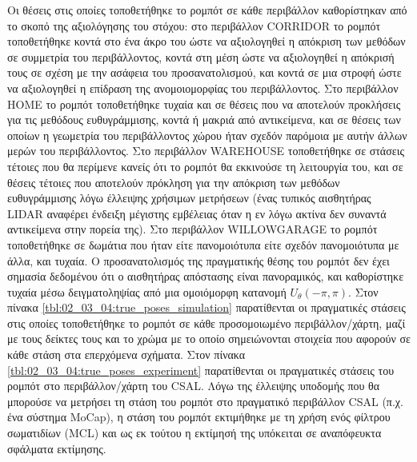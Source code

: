 Οι θέσεις στις οποίες τοποθετήθηκε το ρομπότ σε κάθε περιβάλλον καθορίστηκαν
από το σκοπό της αξιολόγησης του στόχου: στο περιβάλλον CORRIDOR το ρομπότ
τοποθετήθηκε κοντά στο ένα άκρο του ώστε να αξιολογηθεί η απόκριση των μεθόδων
σε συμμετρία του περιβάλλοντος, κοντά στη μέση ώστε να αξιολογηθεί η απόκρισή
τους σε σχέση με την ασάφεια του προσανατολισμού, και κοντά σε μια στροφή ώστε
να αξιολογηθεί η επίδραση της ανομοιομορφίας του περιβάλλοντος. Στο περιβάλλον
HOME το ρομπότ τοποθετήθηκε τυχαία και σε θέσεις που να αποτελούν προκλήσεις
για τις μεθόδους ευθυγράμμισης, κοντά ή μακριά από αντικείμενα, και σε θέσεις
των οποίων η γεωμετρία του περιβάλλοντος χώρου ήταν σχεδόν παρόμοια με αυτήν
άλλων μερών του περιβάλλοντος. Στο περιβάλλον WAREHOUSE τοποθετήθηκε σε
στάσεις τέτοιες που θα περίμενε κανείς ότι το ρομπότ θα εκκινούσε τη λειτουργία
του, και σε θέσεις τέτοιες που αποτελούν πρόκληση για την απόκριση των μεθόδων
ευθυγράμμισης λόγω έλλειψης χρήσιμων μετρήσεων (ένας τυπικός αισθητήρας LIDAR
αναφέρει ένδειξη μέγιστης εμβέλειας όταν η εν λόγω ακτίνα δεν συναντά
αντικείμενα στην πορεία της). Στο περιβάλλον WILLOWGARAGE το ρομπότ
τοποθετήθηκε σε δωμάτια που ήταν είτε πανομοιότυπα είτε σχεδόν πανομοιότυπα με
άλλα, και τυχαία. Ο προσανατολισμός της πραγματικής θέσης του ρομπότ δεν έχει
σημασία δεδομένου ότι ο αισθητήρας απόστασης είναι πανοραμικός, και καθορίστηκε
τυχαία μέσω δειγματοληψίας από μια ομοιόμορφη κατανομή $U_\theta(-\pi,\pi)$.
Στον πίνακα \ref{tbl:02_03_04:true_poses_simulation} παρατίθενται οι
πραγματικές στάσεις στις οποίες τοποθετήθηκε το ρομπότ σε κάθε προσομοιωμένο
περιβάλλον/χάρτη, μαζί με τους δείκτες τους και το χρώμα με το οποίο
σημειώνονται στοιχεία που αφορούν σε κάθε στάση στα επερχόμενα σχήματα.  Στον
πίνακα \ref{tbl:02_03_04:true_poses_experiment} παρατίθενται οι πραγματικές
στάσεις του ρομπότ στο περιβάλλον/χάρτη του CSAL. Λόγω της έλλειψης υποδομής
που θα μπορούσε να μετρήσει τη στάση του ρομπότ στο πραγματικό περιβάλλον CSAL
(π.χ.  ένα σύστημα MoCap), η στάση του ρομπότ εκτιμήθηκε με τη χρήση ενός
φίλτρου σωματιδίων (MCL) και ως εκ τούτου η εκτίμησή της υπόκειται σε
αναπόφευκτα σφάλματα εκτίμησης.

